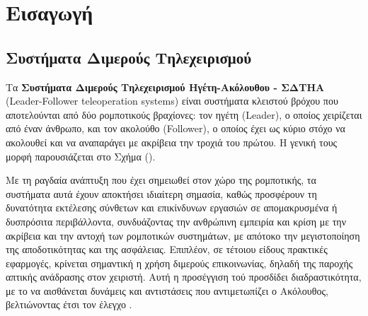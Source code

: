\chapter{Εισαγωγή} \label{Chapter1}



\section{Συστήματα Διμερούς Τηλεχειρισμού} \label{Chapter1Section1}
Τα \textbf{Συστήματα Διμερούς Τηλεχειρισμού Ηγέτη-Ακόλουθου - ΣΔΤΗΑ} (Leader-Follower teleoperation systems) είναι συστήματα κλειστού βρόχου που αποτελούνται από δύο ρομποτικούς βραχίονες: τον ηγέτη (Leader), ο οποίος χειρίζεται από έναν άνθρωπο, και τον ακολούθο (Follower), ο οποίος έχει ως κύριο στόχο να ακολουθεί και να αναπαράγει με ακρίβεια την τροχιά του πρώτου. Η γενική τους μορφή παρουσιάζεται στο Σχήμα ().

\bigskip
Με τη ραγδαία ανάπτυξη που έχει σημειωθεί στον χώρο της ρομποτικής, τα συστήματα αυτά έχουν αποκτήσει ιδιαίτερη σημασία, καθώς προσφέρουν τη δυνατότητα εκτέλεσης σύνθετων και επικίνδυνων εργασιών σε απομακρυσμένα ή δυσπρόσιτα περιβάλλοντα, συνδυάζοντας την ανθρώπινη εμπειρία και κρίση με την ακρίβεια και την αντοχή των ρομποτικών συστημάτων, με απότοκο την μεγιστοποίηση της αποδοτικότητας και της ασφάλειας. Επιπλέον, σε τέτοιου είδους πρακτικές εφαρμογές, κρίνεται σημαντική η χρήση διμερούς επικοινωνίας, δηλαδή της παροχής απτικής ανάδρασης στον χειριστή. Αυτή η προσέγγιση τού προσδίδει διαδραστικότητα, με το να αισθάνεται δυνάμεις και αντιστάσεις που αντιμετωπίζει ο Ακόλουθος, βελτιώνοντας έτσι τον έλεγχο . 

